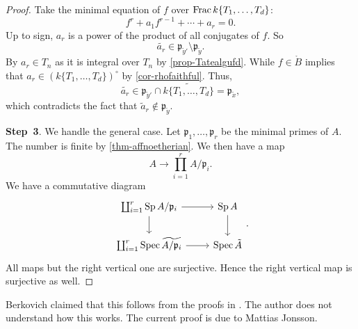 \begin{proof}
    Take the minimal equation of $f$ over $\operatorname{Frac} k\{T_1,\ldots,T_d\}$:
    \[
        f^r+a_1f^{r-1}+\cdots+a_r=0.  
    \]
    Up to sign, $a_r$ is a power of the product of all conjugates of $f$. So
    \[
        \widetilde{a_r}\in \mathfrak{p}_{\tilde{y}'}\setminus  \mathfrak{p}_{\tilde{y}}. 
    \]
    By $a_r\in T_n$ as it is integral over $T_n$ by \cref{prop-Tatealgufd}. While $f\in \mathring{B}$ implies that $a_r\in (k\{T_1,\ldots,T_d\})^{\circ}$ by \cref{cor-rhofaithful}. Thus, 
    \[
        \widetilde{a_r}\in  \mathfrak{p}_{\tilde{y}'}\cap \widetilde{k\{T_1,\ldots,T_d\}}=\mathfrak{p}_{\tilde{x}}, 
    \]
    which contradicts the fact that $\tilde{a}_r\not\in \mathfrak{p}_{\tilde{y}}$.
    
    \textbf{Step~3}. We handle the general case.  Let $\mathfrak{p}_1,\ldots,\mathfrak{p}_r$ be the minimal primes of $A$. The number is finite by \cref{thm-affnoetherian}. We then have a map
    \[
        A\rightarrow \prod_{i=1}^r A/\mathfrak{p}_i.
    \]
    We have a commutative diagram
    \[
    \begin{tikzcd}
        \coprod_{i=1}^r \Sp A/\mathfrak{p}_i \arrow[r] \arrow[d]     & \Sp A \arrow[d] \\
        \coprod_{i=1}^r \Spec \widetilde{A/\mathfrak{p}_i} \arrow[r] & \Spec \tilde{A}
    \end{tikzcd}.
    \]
    All maps but the right vertical one are surjective. Hence the right vertical map is surjective as well.
\end{proof}
\begin{remark}
    Berkovich \cite{Berk12} claimed that this follows from the proofs in \cite{BGR}. The author does not understand how this works. The current proof is due to Mattias Jonsson.
\end{remark}


